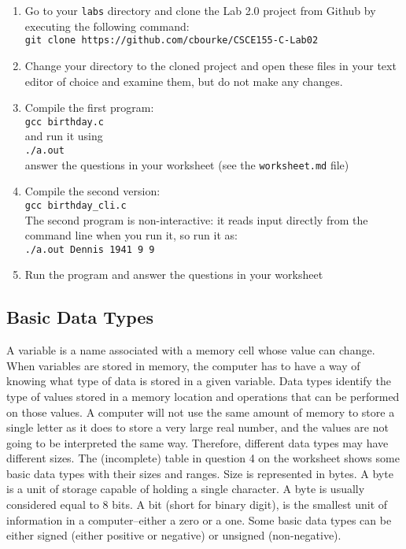 \documentclass[12pt]{scrartcl}
\begin{document}
\begin{enumerate}
  \item Go to your \texttt{labs} directory and clone the Lab 2.0 project
  	from Github by executing the following command:\\
	\texttt{git clone https://github.com/cbourke/CSCE155-C-Lab02}
  \item Change your directory to the cloned project and open these files in
  	your text editor of choice and examine them, but do not make any changes.
  \item Compile the first program: \\
  \texttt{gcc birthday.c} \\
  and run it using \\
  \texttt{./a.out} \\
  answer the questions in your worksheet (see the 
  \texttt{worksheet.md} file)
  \item Compile the second version: \\
  \texttt{gcc birthday_cli.c} \\
  The second program is non-interactive: it reads input directly from the
  command line when you run it, so run it as:\\
	\texttt{./a.out Dennis 1941 9 9}
  \item Run the program and answer the questions in your worksheet
\end{enumerate}

\subsection{Basic Data Types}

A variable is a name associated with a memory cell whose value can change.
When variables are stored in memory, the computer has to have a way of
knowing what type of data is stored in a given variable.  Data types identify
the type of values stored in a memory location and operations that can be
performed on those values.  A computer will not use the same amount of
memory to store a single letter as it does to store a very large real number,
and the values are not going to be interpreted the same way.  Therefore,
different data types may have different sizes. The (incomplete) table in
question 4 on the worksheet shows some basic data types with their
sizes and ranges.  Size is represented in bytes.  A byte is a unit of storage
capable of holding a single character.  A byte is usually considered equal
to 8 bits.  A bit (short for binary digit), is the smallest unit of information in
a computer--either a zero or a one.  Some basic data types can be either
signed (either positive or negative) or unsigned (non-negative).
\end{document}
